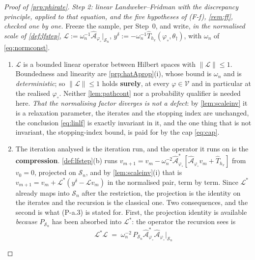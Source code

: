 \begin{proof}[Proof of \cref{prp:phirate}]
\emph{Step 2: linear Landweber--Fridman with the discrepancy principle, applied to that equation, and
the five hypotheses of \textup{(F-f)}, \cref{rem:ff}, checked one by one.} Freeze the sample, per
Step~0, and write, \emph{in the normalised scale of \cref{def:lfstep}},
$\mathcal L:=\omega_n^{-1}\hat{\mathcal A}_{\varphi_\circ}\vert_{\mathcal S_n}$,
$y^\delta:=-\omega_n^{-1}\hat T_{h_x}(\varphi_\circ,\theta_\dagger)$, with $\omega_n$ of
\eqref{eq:normconst}.
\begin{enumerate}
\item[(L1)] $\mathcal L$ is a bounded linear operator between Hilbert spaces with
$\|\mathcal L\|\le1$. Boundedness and linearity are \cref{prp:hatAprop}(i), whose bound is
$\omega_n$ and is \emph{deterministic}; so $\|\mathcal L\|\le1$ holds \textbf{surely}, at every
$\varphi\in\mathcal V$ and in particular at the realised $\varphi_\circ$. Neither
\cref{lem:pathcont} nor a probability qualifier is needed here. \emph{That the normalising factor
diverges is not a defect}: by \cref{lem:scaleinv} it is a relaxation parameter, the iterates and the
stopping index are unchanged, the conclusion \eqref{eq:linlf} is exactly invariant in it, and the one
thing that is not invariant, the stopping-index bound, is paid for by the cap \eqref{eq:cap}.
\item[(L2)] The iteration analysed is the iteration run, and the operator it runs on is the
\textbf{compression}. \cref{def:lfstep}(b) runs
$v_{m+1}=v_m-\omega_n^{-2}\hat{\mathcal A}^{\ast}_{\varphi_\circ}[\hat{\mathcal A}_{\varphi_\circ}v_m+\hat T_{h_x}]$
from $v_0=0$, projected on $\mathcal S_n$, and by \cref{lem:scaleinv}(i) that is
$v_{m+1}=v_m+\mathcal L^{\ast}(y^\delta-\mathcal Lv_m)$ in the normalised pair, term by term.
Since $\mathcal L^{\ast}$ already maps into $\mathcal S_n$ after the restriction, the projection is
the identity on the iterates and the recursion is the classical one.
Two consequences, and the second is what (P-a.3) is stated for. First, the projection identity is
available \emph{because} $P_{\mathcal S_n}$ has been absorbed into $\mathcal L^{\ast}$: the operator the
recursion sees is
\begin{equation}\label{eq:LstarL}
\mathcal L^{\ast}\mathcal L\;=\;\omega_n^{-2}\,P_{\mathcal S_n}\hat{\mathcal A}^{\ast}_{\varphi_\circ}\hat{\mathcal A}_{\varphi_\circ}\big\vert_{\mathcal S_n}

\end{equation}
\end{enumerate}
\end{proof}
